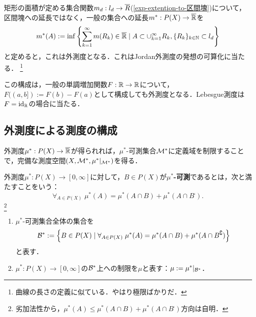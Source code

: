 \documentclass[uplatex, dvipdfmx]{jsreport}
\begin{document}
\begin{example}\label{exp-Lebesgue-outer-measure}
    矩形の面積が定める集合関数$m_d:l_d\to\overline{R}$(\ref{exp-extention-to-区間塊})について，区間塊への延長ではなく，一般の集合への延長$m^*:P(X)\to\overline{\mathbb{R}}$を
    \[m^*(A):=\inf\left\{\sum_{k=1}^\infty m(R_k)\in\overline{\mathbb{R}}\mid A\subset\cup^\infty_{k=1}R_k,\{R_k\}_{k\in\mathbb{N}}\subset l_d\right\}\]
    と定めると，これは外測度となる．これはJordan外測度の発想の可算化に当たる．
    \footnote{曲線の長さの定義に似ている．やはり極限ばかりだ．}
\end{example}
\begin{example}\label{exp-Lebesgue-Stieltjes-outer-measure}
    この構成は，一般の単調増加関数$F:\mathbb{R}\to\mathbb{R}$について，$F((a,b]):=F(b)-F(a)$として構成しても外測度となる．Lebesgue測度は$F=\mathrm{id}_{\mathbb{R}}$の場合に当たる．
\end{example}

\subsection{外測度による測度の構成}

\begin{tcolorbox}[colframe=ForestGreen, colback=ForestGreen!10!white,breakable,colbacktitle=ForestGreen!40!white,coltitle=black,fonttitle=\bfseries\sffamily,
title=]
    外測度$\mu^*:P(X)\to\overline{\mathbb{R}}$が得られれば，$\mu^*$-可測集合$\mathcal{M}^*$に定義域を制限することで，完備な測度空間$(X,\mathcal{M}^*,\mu^*|_{\mathcal{M}^*})$を得る．
\end{tcolorbox}

\begin{definition}
    外測度$\mu^*:P(X)\to[0,\infty]$に対して，$B\in P(X)$が\textbf{$\mu^*$-可測}であるとは，次と満たすことをいう：
    \[\forall_{A\in P(X)}\;\mu^*(A)=\mu^*(A\cap B)+\mu^*(A\cap B^\comp).\]\footnote{劣加法性から，$\mu^*(A)\le\mu^*(A\cap B)+\mu^*(A\cap B^\comp)$方向は自明．}
\end{definition}

\begin{notation}\mbox{}
    \begin{enumerate}
        \item $\mu^*$-可測集合全体の集合を\[\mathcal{B}^*:=\left\{B\in P(X)\mid \forall_{A\in P(X)}\;\mu^*(A)=\mu^*(A\cap B)+\mu^*(A\cap B^\complement)\right\}\]と表す．
        \item $\mu^*:P(X)\to[0,\infty]$の$\mathcal{B}^*$上への制限を$\mu$と表す：$\mu:=\mu^*|_{\mathcal{B}^*}$．
    \end{enumerate}
\end{notation}
\end{document}
